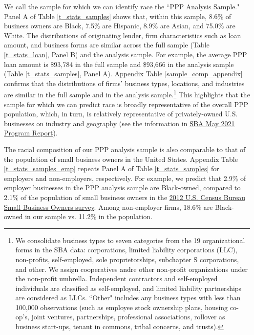 \documentclass[11pt]{article}
\begin{document}
We call the sample for which we can identify race the ``PPP Analysis Sample." Panel A of Table \ref{t_stats_samples} shows that, within this sample, 8.6\% of business owners are Black, 7.5\% are Hispanic, 8.9\% are Asian, and 75.0\% are White. The distributions of originating lender, firm characteristics such as loan amount, and business forms are similar across the full sample (Table \ref{t_stats_loan}, Panel B) and the analysis sample. For example, the average PPP loan amount is \$93,784 in the full sample and \$93,666 in the analysis sample (Table \ref{t_stats_samples}, Panel A).  Appendix Table \ref{sample_comp_appendix} confirms that the distributions of firms' business types, locations, and industries are similar in the full sample and in the analysis sample.\footnote{We consolidate business types to seven categories from the 19 organizational forms in the SBA data: corporations, limited liability corporations (LLC), non-profits, self-employed, sole proprietorships, subchapter S corporations, and other. We assign cooperatives andre other non-profit organizations under the non-profit umbrella. Independent contractors and self-employed individuals are classified as self-employed, and limited liability partnerships are considered as LLCs. ``Other" includes any business types with less than 100,000 observations (such as employee stock ownership plans, housing co-op's, joint ventures, partnerships, professional associations, rollover as business start-ups, tenant in commons, tribal concerns, and trusts).} This highlights that the sample for which we can predict race is broadly representative of the overall PPP population, which, in turn, is relatively representative of privately-owned U.S. businesses on industry and geography (see the information in \href{https://www.sba.gov/document/report-sba-covid-relief-program-report}{SBA May 2021 Program Report}).

The racial composition of our PPP analysis sample is also comparable to that of the population of small business owners in the United States. Appendix Table \ref{t_stats_samples_emp} repeats Panel A of Table \ref{t_stats_samples} for employers and non-employers, respectively. For example, we predict that 2.9\% of employer businesses in the PPP analysis sample are Black-owned, compared to 2.1\% of the population of small business owners in the  \href{https://www.census.gov/library/publications/2012/econ/2012-sbo.html}{2012 U.S. Census Bureau Small Business Owners survey}. Among non-employer firms, 18.6\% are Black-owned in our sample vs. 11.2\% in the population.
\end{document}
